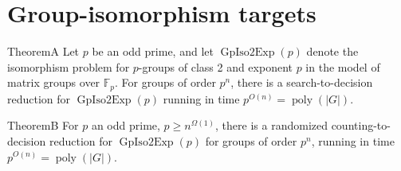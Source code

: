 \section*{Group-isomorphism targets}
\begin{authorclaim}{TheoremA}
Let $p$ be an odd prime, and let $\operatorname{GpIso2Exp}(p)$ denote the isomorphism problem for $p$-groups of class 2 and exponent $p$ in the model of matrix groups over $\mathbb F_p$. For groups of order $p^n$, there is a search-to-decision reduction for $\operatorname{GpIso2Exp}(p)$ running in time $p^{O(n)}=\operatorname{poly}(|G|)$.
\end{authorclaim}
\begin{authorclaim}{TheoremB}
For $p$ an odd prime, $p\ge n^{\Omega(1)}$, there is a randomized counting-to-decision reduction for $\operatorname{GpIso2Exp}(p)$ for groups of order $p^n$, running in time $p^{O(n)}=\operatorname{poly}(|G|)$.
\end{authorclaim}
